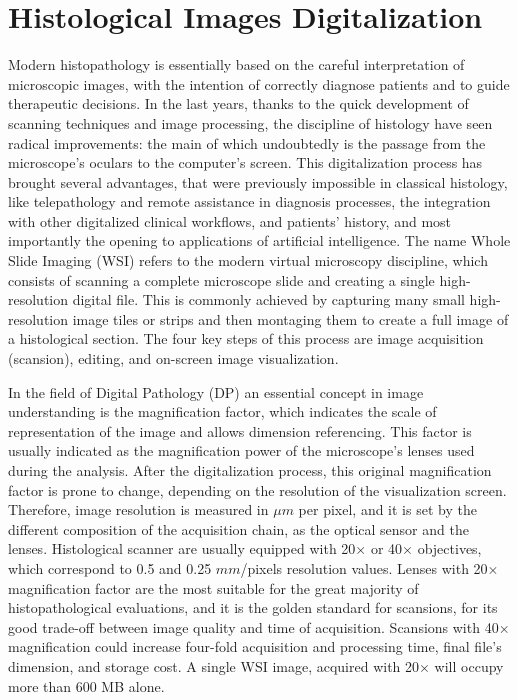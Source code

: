 \section{Histological Images Digitalization} \label{ssec:hist_im}
    Modern histopathology is essentially based on the careful interpretation of microscopic images, with the intention of correctly diagnose patients and to guide therapeutic decisions. In the last years, thanks to the quick development of scanning techniques and image processing, the discipline of histology have seen radical improvements: the main of which undoubtedly is the passage from the microscope's oculars to the computer's screen. This digitalization process has brought several advantages, that were previously impossible in classical histology, like telepathology and remote assistance in diagnosis processes, the integration with other digitalized clinical workflows, and patients' history, and most importantly the opening to applications of artificial intelligence.
    The name Whole Slide Imaging (WSI) refers to the modern virtual microscopy discipline, which consists of scanning a complete microscope slide and creating a single high-resolution digital file. This is commonly achieved by capturing many small high-resolution image tiles or strips and then montaging them to create a full image of a histological section. The four key steps of this process are image acquisition (scansion), editing, and on-screen image visualization.

    In the field of Digital Pathology (DP) an essential concept in image understanding is the magnification factor, which indicates the scale of representation of the image and allows dimension referencing. This factor is usually indicated as the magnification power of the microscope's lenses used during the analysis. After the digitalization process, this original magnification factor is prone to change, depending on the resolution of the visualization screen. Therefore, image resolution is measured in $\mu m$ per pixel, and it is set by the different composition of the acquisition chain, as the optical sensor and the lenses. Histological scanner are usually equipped with 20$\times$ or 40$\times$ objectives, which correspond to 0.5 and 0.25 $mm$/pixels resolution values. Lenses with 20$\times$ magnification factor are the most suitable for the great majority of histopathological evaluations, and it is the golden standard for scansions, for its good trade-off between image quality and time of acquisition. Scansions with 40$\times$ magnification could increase four-fold acquisition and processing time, final file's dimension, and storage cost. A single WSI image, acquired with 20$\times$ will occupy more than 600 MB alone.


